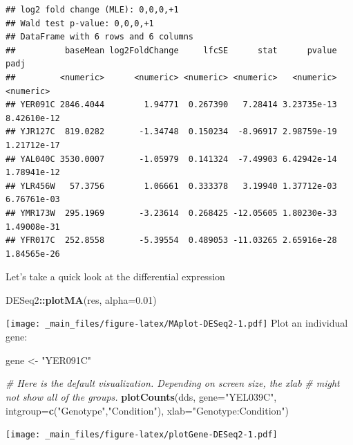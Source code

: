 \documentclass[
]{book}
\newenvironment{Shaded}{\begin{snugshade}}{\end{snugshade}}
\newcommand{\AttributeTok}[1]{\textcolor[rgb]{0.13,0.29,0.53}{#1}}
\newcommand{\CommentTok}[1]{\textcolor[rgb]{0.56,0.35,0.01}{\textit{#1}}}
\newcommand{\FloatTok}[1]{\textcolor[rgb]{0.00,0.00,0.81}{#1}}
\newcommand{\FunctionTok}[1]{\textcolor[rgb]{0.13,0.29,0.53}{\textbf{#1}}}
\newcommand{\NormalTok}[1]{#1}
\newcommand{\OtherTok}[1]{\textcolor[rgb]{0.56,0.35,0.01}{#1}}
\newcommand{\SpecialCharTok}[1]{\textcolor[rgb]{0.81,0.36,0.00}{\textbf{#1}}}
\newcommand{\StringTok}[1]{\textcolor[rgb]{0.31,0.60,0.02}{#1}}
\begin{document}
\begin{verbatim}
## log2 fold change (MLE): 0,0,0,+1 
## Wald test p-value: 0,0,0,+1 
## DataFrame with 6 rows and 6 columns
##          baseMean log2FoldChange     lfcSE      stat      pvalue        padj
##         <numeric>      <numeric> <numeric> <numeric>   <numeric>   <numeric>
## YER091C 2846.4044        1.94771  0.267390   7.28414 3.23735e-13 8.42610e-12
## YJR127C  819.0282       -1.34748  0.150234  -8.96917 2.98759e-19 1.21712e-17
## YAL040C 3530.0007       -1.05979  0.141324  -7.49903 6.42942e-14 1.78941e-12
## YLR456W   57.3756        1.06661  0.333378   3.19940 1.37712e-03 6.76761e-03
## YMR173W  295.1969       -3.23614  0.268425 -12.05605 1.80230e-33 1.49008e-31
## YFR017C  252.8558       -5.39554  0.489053 -11.03265 2.65916e-28 1.84565e-26
\end{verbatim}

Let's take a quick look at the differential expression

\begin{Shaded}
\begin{Highlighting}[]
\NormalTok{DESeq2}\SpecialCharTok{::}\FunctionTok{plotMA}\NormalTok{(res, }\AttributeTok{alpha=}\FloatTok{0.01}\NormalTok{)}
\end{Highlighting}
\end{Shaded}

\texttt{[image: \_main\_files/figure-latex/MAplot-DESeq2-1.pdf]}
Plot an individual gene:

\begin{Shaded}
\begin{Highlighting}[]
\NormalTok{gene }\OtherTok{\textless{}{-}} \StringTok{"YER091C"}

\CommentTok{\# Here is the default visualization. Depending on screen size, the xlab }
\CommentTok{\# might not show all of the groups.}
\FunctionTok{plotCounts}\NormalTok{(dds, }\AttributeTok{gene=}\StringTok{"YEL039C"}\NormalTok{, }\AttributeTok{intgroup=}\FunctionTok{c}\NormalTok{(}\StringTok{"Genotype"}\NormalTok{,}\StringTok{"Condition"}\NormalTok{),}
           \AttributeTok{xlab=}\StringTok{"Genotype:Condition"}\NormalTok{)}
\end{Highlighting}
\end{Shaded}

\texttt{[image: \_main\_files/figure-latex/plotGene-DESeq2-1.pdf]}
\end{document}
